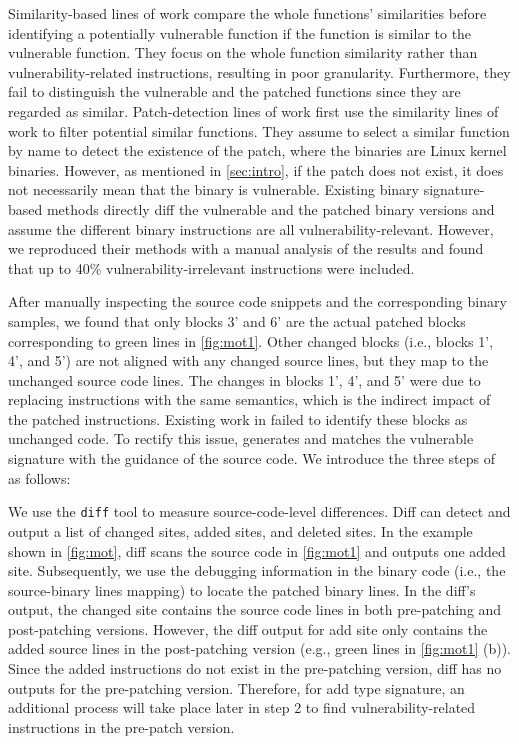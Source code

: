  
Similarity-based lines of work compare the whole functions' similarities before identifying a potentially vulnerable function if the function is similar to the vulnerable function. 
They focus on the whole function similarity rather than vulnerability-related instructions, resulting in poor granularity. 
Furthermore, they fail to distinguish the vulnerable and the patched functions since they are regarded as similar. 
Patch-detection lines of work first use the similarity lines of work to filter potential similar functions. 
They assume to select a similar function by name to detect the existence of the patch, where the binaries are Linux kernel binaries. 
However, as mentioned in \autoref{sec:intro}, if the patch does not exist, it does not necessarily mean that the binary is vulnerable. 
Existing binary signature-based methods directly diff the vulnerable and the patched binary versions and assume the different binary instructions are all vulnerability-relevant. 
However, we reproduced their methods with a manual analysis of the results and found that up to 40\% vulnerability-irrelevant instructions were included.


After manually inspecting the source code snippets and the corresponding binary samples, we found that only blocks 3' and 6' are the actual patched blocks corresponding to green lines in \autoref{fig:mot1}. 
Other changed blocks (i.e., blocks 1', 4', and 5') are not aligned with any changed source lines, but they map to the unchanged source code lines.
The changes in blocks 1', 4', and 5' were due to replacing instructions with the same semantics, which is the indirect impact of the patched instructions. 
Existing work in \cite{vmpbl, binxray, viva} failed to identify these blocks as unchanged code.
To rectify this issue, \name generates and matches the vulnerable signature with the guidance of the source code. 
We introduce the three steps of \name as follows:


We use the \texttt{diff} tool to measure source-code-level differences. 
Diff can detect and output a list of changed sites, added sites, and deleted sites. 
In the example shown in \autoref{fig:mot}, diff scans the source code in \autoref{fig:mot1} and outputs one added site. 
Subsequently, we use the debugging information in the binary code (i.e., the source-binary lines mapping) to locate the patched binary lines. 
In the diff's output, the changed site contains the source code lines in both pre-patching and post-patching versions. 
However, the diff output for add site only contains the added source lines in the post-patching version (e.g., green lines in \autoref{fig:mot1} (b)). 
Since the added instructions do not exist in the pre-patching version, diff has no outputs for the pre-patching version.
Therefore, for add type signature, an additional process will take place later in step 2 to find vulnerability-related instructions in the pre-patch version. 

